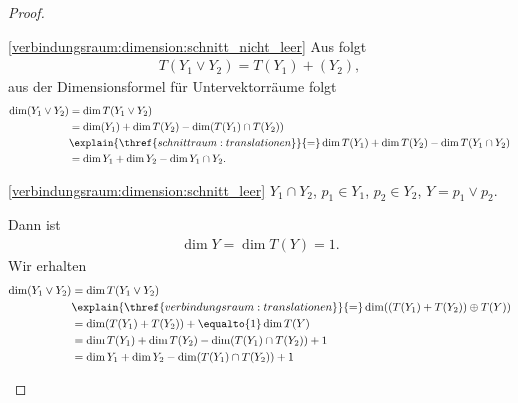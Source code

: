 \begin{proof}
    \begin{proofdescription}
        
        \item[\ref{verbindungsraum:dimension:schnitt_nicht_leer}] Aus  folgt
        \begin{align*}
            T(Y_1\vee Y_2)=T(Y_1)+(Y_2),
        \end{align*}
        aus der Dimensionsformel für Untervektorräume folgt
        \begin{align*}
            \dim (Y_1\vee Y_2)\begin{aligned}[t] 
                &=\dim T(Y_1\vee Y_2)\\
                &=\dim(Y_1)+\dim T(Y_2)-\dim(T(Y_1)\cap T(Y_2))\\
                &\explain{\thref{schnittraum:translationen}}{=}\dim T(Y_1)+\dim T(Y_2)-\dim T(Y_1\cap Y_2)\\
                &=\dim Y_1+\dim Y_2-\dim Y_1\cap Y_2.
            \end{aligned}
        \end{align*}
        
        \item[\ref{verbindungsraum:dimension:schnitt_leer}] \( Y_1\cap Y_2 \), \( p_1\in Y_1 \), \( p_2\in Y_2 \), \( Y=p_1\vee p_2 \).
        
        Dann ist
        \begin{align*}
            \dim Y=\dim T(Y)=1.
        \end{align*}
        Wir erhalten
        \begin{align*}
            \dim (Y_1\vee Y_2)\begin{aligned}[t] 
                &=\dim T(Y_1\vee Y_2)\\
                &\explain{\thref{verbindungsraum:translationen}}{=}\dim((T(Y_1)+T(Y_2))\oplus T(Y))\\
                &=\dim(T(Y_1)+T(Y_2))+\equalto{1}\dim T(Y)\\
                &=\dim T(Y_1)+\dim T(Y_2)- \dim (T(Y_1)\cap T(Y_2))+1\\
                &=\dim Y_1+\dim Y_2 -\dim(T(Y_1)\cap T(Y_2))+1
            \end{aligned}
        \end{align*}
    \end{proofdescription}
    
\end{proof}
